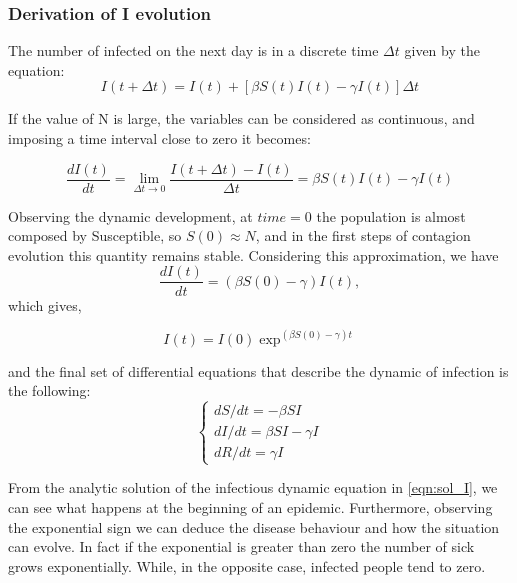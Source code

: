 \subsubsection{Derivation of I evolution}
The number of infected on the next day is in a discrete time $\Delta t$ given by the equation:
\begin{equation}
	I(t+\Delta t) = I(t) + [\beta S(t)I(t) - \gamma I(t)]\Delta t
\end{equation}

If the value of N is large, the variables can be considered as continuous, and imposing a time interval close to zero it becomes:

\begin{equation}
	\frac{d I(t)}{dt} = \lim_{\Delta t \rightarrow  0} \frac{I(t+\Delta t)-I(t)}{\Delta t} = \beta S(t) I(t)- \gamma I(t)
\end{equation}

Observing the dynamic development,  at $time = 0$ the population is almost composed by Susceptible, so $S(0) \approx N$, and in the first steps of contagion evolution this quantity remains stable. Considering this approximation, we have
\begin{equation}
		\frac{d I(t)}{dt} = (\beta S(0)-\gamma)I(t),
\end{equation} 
which gives,

\begin{equation}
	I(t) = I(0) \exp ^{(\beta S(0)- \gamma)t}
	\label{eqn:sol_I}
\end{equation}

 and the final set of differential equations that  describe the dynamic of infection is the following:
 \begin{equation}
 	\begin{cases}
 		dS / dt = -\beta S I \\
 		dI / dt = \beta S I - \gamma I\\
 		dR / dt =  \gamma I
 	\end{cases}
 \end{equation}


From the analytic solution  of the infectious dynamic equation in \ref{eqn:sol_I}, we can see what happens at the beginning of an epidemic. Furthermore, observing the exponential sign we can deduce the disease behaviour and how the situation can evolve.
In fact if the exponential is greater than zero the number of sick grows exponentially. While, in the opposite case, infected people tend to zero. 

